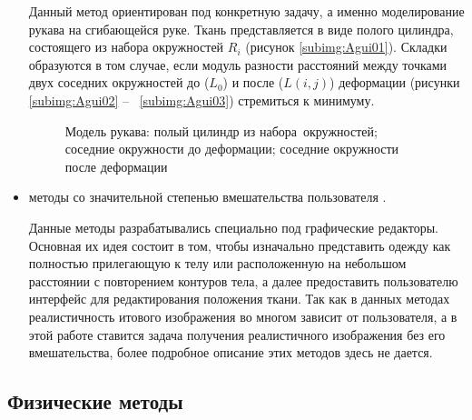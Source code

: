 \begin{itemize}[left=\parindent]
        Данный метод ориентирован под конкретную задачу, а именно моделирование
        рукава на сгибающейся руке. Ткань представляется в виде полого
        цилиндра, состоящего из набора окружностей $R_i$ (рисунок
        \ref{subimg:Agui01}). Складки образуются в том случае, если модуль
        разности расстояний между точками двух соседних окружностей
        до ($L_0$) и после ($L(i,j)$) деформации (рисунки \ref{subimg:Agui02}
        --~ \ref{subimg:Agui03}) стремиться к минимуму\cite{bib07}.
        ~\\
        \begin{figure}[ht!]
            \vspace{-4ex}
            \centering
            \hspace{2ex}
            \hspace{2ex}
            \caption{Модель рукава: 
                  полый цилиндр из набора~окружностей;\\
                  соседние окружности до деформации;
                  соседние окружности после деформации}
            \label{fig:Agui}
        \end{figure}


    \item методы со значительной степенью вмешательства пользователя
        \cite{bib09}\cite{bib10}.

        Данные методы разрабатывались специально под графические редакторы.
        Основная их идея состоит в том, чтобы изначально представить одежду
        как полностью прилегающую к телу или расположенную на небольшом 
        расстоянии с повторением контуров тела, а далее предоставить пользователю
        интерфейс для редактирования положения ткани. Так как в данных методах
        реалистичность итового изображения во многом зависит от пользователя,
        а в этой работе ставится задача получения реалистичного изображения без
        его вмешательства, более подробное описание этих методов здесь не
        дается.

\end{itemize}

\subsection{Физические методы}

